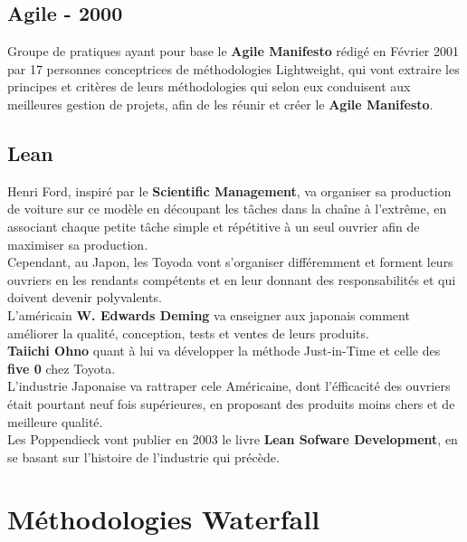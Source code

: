 \documentclass{report}
\begin{document}
	\section{Agile - 2000}

		Groupe de pratiques ayant pour base le \textbf{Agile Manifesto} rédigé en Février 2001 par 17 personnes conceptrices de méthodologies Lightweight, qui vont extraire les principes et critères de leurs méthodologies qui selon eux conduisent aux meilleures gestion de projets, afin de les réunir et créer le \textbf{Agile Manifesto}.\\

	\section{Lean}

		Henri Ford, inspiré par le \textbf{Scientific Management}, va organiser sa production de voiture sur ce modèle en découpant les tâches dans la chaîne à l'extrême, en associant chaque petite tâche simple et répétitive à un seul ouvrier afin de maximiser sa production.\\

		Cependant, au Japon, les Toyoda vont s'organiser différemment et forment leurs ouvriers en les rendants compétents et en leur donnant des responsabilités et qui doivent devenir polyvalents.\\

		L'américain \textbf{W. Edwards Deming} va enseigner aux japonais comment améliorer la qualité, conception, tests et ventes de leurs produits.\\
		\textbf{Taiichi Ohno} quant à lui va développer la méthode Just-in-Time et celle des \textbf{five 0} chez Toyota.\\

		L'industrie Japonaise va rattraper cele Américaine, dont l'éfficacité des ouvriers était pourtant neuf fois supérieures, en proposant des produits moins chers et de meilleure qualité.\\

		Les Poppendieck vont publier en 2003 le livre \textbf{Lean Sofware Development}, en se basant sur l'histoire de l'industrie qui précède.\\


\chapter{Méthodologies Waterfall}

	
\end{document}
